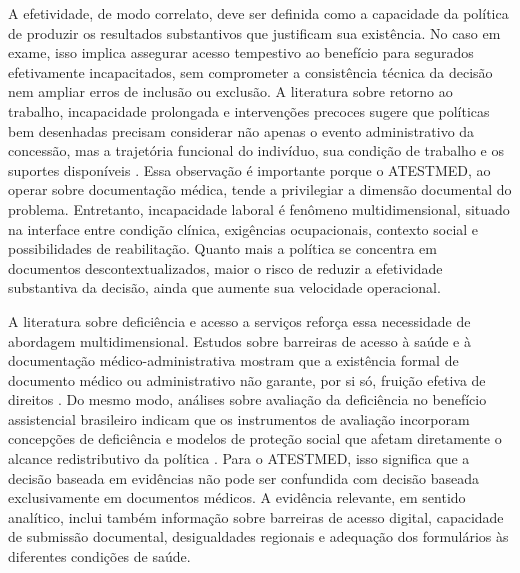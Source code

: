 \documentclass[12pt,a4paper]{article}
\begin{document}
A efetividade, de modo correlato, deve ser definida como a capacidade da política de produzir os resultados substantivos que justificam sua existência. No caso em exame, isso implica assegurar acesso tempestivo ao benefício para segurados efetivamente incapacitados, sem comprometer a consistência técnica da decisão nem ampliar erros de inclusão ou exclusão. A literatura sobre retorno ao trabalho, incapacidade prolongada e intervenções precoces sugere que políticas bem desenhadas precisam considerar não apenas o evento administrativo da concessão, mas a trajetória funcional do indivíduo, sua condição de trabalho e os suportes disponíveis \parencite{gabbay2011niceguidanceonlongtermsicknessandincapacity,przysada2019anassessmentofworkabilityafterthecompletionofre}. Essa observação é importante porque o ATESTMED, ao operar sobre documentação médica, tende a privilegiar a dimensão documental do problema. Entretanto, incapacidade laboral é fenômeno multidimensional, situado na interface entre condição clínica, exigências ocupacionais, contexto social e possibilidades de reabilitação. Quanto mais a política se concentra em documentos descontextualizados, maior o risco de reduzir a efetividade substantiva da decisão, ainda que aumente sua velocidade operacional.

A literatura sobre deficiência e acesso a serviços reforça essa necessidade de abordagem multidimensional. Estudos sobre barreiras de acesso à saúde e à documentação médico-administrativa mostram que a existência formal de documento médico ou administrativo não garante, por si só, fruição efetiva de direitos \parencite{m2024astudyofdisabilityseveritybarriersandfacilitatingfactor,rajasulochana2026doeshavingadisabilitycertificateensurebenefit}. Do mesmo modo, análises sobre avaliação da deficiência no benefício assistencial brasileiro indicam que os instrumentos de avaliação incorporam concepções de deficiência e modelos de proteção social que afetam diretamente o alcance redistributivo da política \parencite{nogueira20200731t0100000100aavaliacaodadeficiencianatraje}. Para o ATESTMED, isso significa que a decisão baseada em evidências não pode ser confundida com decisão baseada exclusivamente em documentos médicos. A evidência relevante, em sentido analítico, inclui também informação sobre barreiras de acesso digital, capacidade de submissão documental, desigualdades regionais e adequação dos formulários às diferentes condições de saúde.
\end{document}
